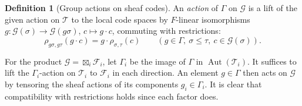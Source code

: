 \documentclass[11pt,letterpaper]{article}
\renewcommand{\le}{\leqslant}
\theoremstyle{definition}
\newtheorem{definition}[theorem]{Definition}
\theoremstyle{remark}
\newcommand{\cF}{\mathcal F}
\begin{document}
\begin{definition}[Group actions on sheaf codes]
\label{def:sheaf-action}
An \emph{action} of $\Gamma$ on $\mathcal G$ is a lift of the
given action on $\mathcal T$ to the local code spaces by
$F$-linear isomorphisms
$g:\mathcal G(\sigma)\to\mathcal G(g\sigma)$,
$c\mapsto g\cdot c$, commuting with restrictions:
\[
 \rho_{g\sigma,g\tau}(g\cdot c)
 =g\cdot\rho_{\sigma,\tau}(c)
 \qquad(g\in\Gamma,\ \sigma\le\tau,\ c\in\mathcal G(\sigma)).
\]
\end{definition}

For the product $\mathcal G=\boxtimes_i\cF_i$, let $\Gamma_i$ be
the image of $\Gamma$ in $\operatorname{Aut}(\mathcal T_i)$.
It suffices to lift the $\Gamma_i$-action on $\mathcal T_i$ to
$\cF_i$ in each direction. An element $g\in\Gamma$ then acts on
$\mathcal G$ by tensoring the sheaf actions of its components
$g_i\in\Gamma_i$. It is clear that compatibility with restrictions holds since each factor does.
\end{document}

